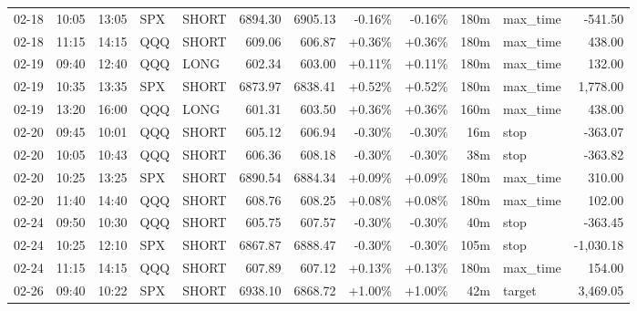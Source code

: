 \documentclass[11pt,a4paper,twoside]{article}
\begin{document}
\begin{center}
\begin{longtable}{>{\color{txtmain}}l l l l l r r r r r >{\color{txtmain}}l r}
02-18 & 10:05 & 13:05 & SPX & SHORT & 6894.30 & 6905.13 & \textcolor{lossred}{-0.16\%} & \textcolor{lossred}{-0.16\%} & 180m & max\_time & \textcolor{lossred}{-541.50} \\
02-18 & 11:15 & 14:15 & QQQ & SHORT & 609.06 & 606.87 & \textcolor{wingreen}{+0.36\%} & \textcolor{wingreen}{+0.36\%} & 180m & max\_time & \textcolor{wingreen}{438.00} \\
02-19 & 09:40 & 12:40 & QQQ & LONG & 602.34 & 603.00 & \textcolor{wingreen}{+0.11\%} & \textcolor{wingreen}{+0.11\%} & 180m & max\_time & \textcolor{wingreen}{132.00} \\
02-19 & 10:35 & 13:35 & SPX & SHORT & 6873.97 & 6838.41 & \textcolor{wingreen}{+0.52\%} & \textcolor{wingreen}{+0.52\%} & 180m & max\_time & \textcolor{wingreen}{1,778.00} \\
02-19 & 13:20 & 16:00 & QQQ & LONG & 601.31 & 603.50 & \textcolor{wingreen}{+0.36\%} & \textcolor{wingreen}{+0.36\%} & 160m & max\_time & \textcolor{wingreen}{438.00} \\
02-20 & 09:45 & 10:01 & QQQ & SHORT & 605.12 & 606.94 & \textcolor{lossred}{-0.30\%} & \textcolor{lossred}{-0.30\%} & 16m & stop & \textcolor{lossred}{-363.07} \\
02-20 & 10:05 & 10:43 & QQQ & SHORT & 606.36 & 608.18 & \textcolor{lossred}{-0.30\%} & \textcolor{lossred}{-0.30\%} & 38m & stop & \textcolor{lossred}{-363.82} \\
02-20 & 10:25 & 13:25 & SPX & SHORT & 6890.54 & 6884.34 & \textcolor{wingreen}{+0.09\%} & \textcolor{wingreen}{+0.09\%} & 180m & max\_time & \textcolor{wingreen}{310.00} \\
02-20 & 11:40 & 14:40 & QQQ & SHORT & 608.76 & 608.25 & \textcolor{wingreen}{+0.08\%} & \textcolor{wingreen}{+0.08\%} & 180m & max\_time & \textcolor{wingreen}{102.00} \\
02-24 & 09:50 & 10:30 & QQQ & SHORT & 605.75 & 607.57 & \textcolor{lossred}{-0.30\%} & \textcolor{lossred}{-0.30\%} & 40m & stop & \textcolor{lossred}{-363.45} \\
02-24 & 10:25 & 12:10 & SPX & SHORT & 6867.87 & 6888.47 & \textcolor{lossred}{-0.30\%} & \textcolor{lossred}{-0.30\%} & 105m & stop & \textcolor{lossred}{-1,030.18} \\
02-24 & 11:15 & 14:15 & QQQ & SHORT & 607.89 & 607.12 & \textcolor{wingreen}{+0.13\%} & \textcolor{wingreen}{+0.13\%} & 180m & max\_time & \textcolor{wingreen}{154.00} \\
02-26 & 09:40 & 10:22 & SPX & SHORT & 6938.10 & 6868.72 & \textcolor{wingreen}{+1.00\%} & \textcolor{wingreen}{+1.00\%} & 42m & target & \textcolor{wingreen}{3,469.05} \\

\end{longtable}
\end{center}
\end{document}

